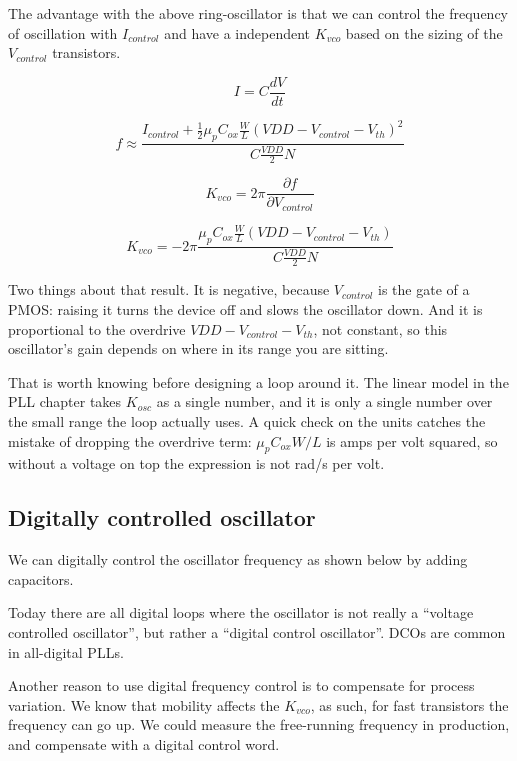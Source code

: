 The advantage with the above ring-oscillator is that we can control the
frequency of oscillation with \(I_{control}\) and have a independent
\(K_{vco}\) based on the sizing of the \(V_{control}\) transistors.

\[ I = C \frac{dV}{dt}\]

\[ f \approx \frac{ I_{control}  + \frac{1}{2}\mu_p C_{ox} \frac{W}{L} (VDD - V_{control} -
V_{th})^2}{C \frac{VDD}{2} N}\]

\[ K_{vco} = 2 \pi \frac{\partial f}{\partial V_{control}}\]

\[ K_{vco} = - 2 \pi  \frac{\mu_p C_{ox} \frac{W}{L} \left(VDD - V_{control} - V_{th}\right) }{C\frac{VDD}{2}N}\]

Two things about that result. It is negative, because \(V_{control}\) is
the gate of a PMOS: raising it turns the device off and slows the
oscillator down. And it is proportional to the overdrive
\(VDD - V_{control} - V_{th}\), not constant, so this oscillator's gain
depends on where in its range you are sitting.

That is worth knowing before designing a loop around it. The linear
model in the PLL chapter takes \(K_{osc}\) as a single number, and it is
only a single number over the small range the loop actually uses. A
quick check on the units catches the mistake of dropping the overdrive
term: \(\mu_p C_{ox} W/L\) is amps per volt squared, so without a
voltage on top the expression is not rad/s per volt.

\subsection{Digitally controlled
oscillator}\label{digitally-controlled-oscillator}

We can digitally control the oscillator frequency as shown below by
adding capacitors.

Today there are all digital loops where the oscillator is not really a
``voltage controlled oscillator'', but rather a ``digital control
oscillator''. DCOs are common in all-digital PLLs.

Another reason to use digital frequency control is to compensate for
process variation. We know that mobility affects the \(K_{vco}\), as
such, for fast transistors the frequency can go up. We could measure the
free-running frequency in production, and compensate with a digital
control word.


{
\centering
{}
}

